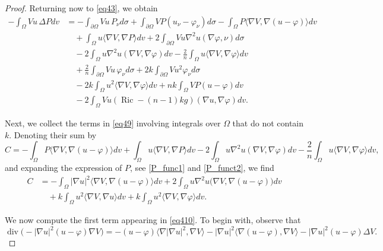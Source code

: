 \documentclass[10pt,a4paper]{amsart}
\begin{document}
\begin{proof}
Returning now to \eqref{eq43}, we obtain
\begin{align}\label{eq49}
-\int_{\Omega}Vu\,\Delta P dv
&=
-\int_{\partial\Omega}Vu\,P_{\nu}d\sigma
+
\int_{\partial\Omega}VP(u_{\nu}-\varphi_{\nu})d\sigma
-
\int_{\Omega}P\langle\nabla V,\nabla(u-\varphi)\rangle dv
\nonumber\\
&\quad
+
\int_{\Omega}u\langle\nabla V,\nabla P\rangle dv
+
2\int_{\partial\Omega}Vu\nabla^{2}u(\nabla\varphi,\nu) d\sigma
\nonumber\\
&\quad
-
2\int_{\Omega}u\nabla^{2}u(\nabla V,\nabla\varphi) dv
-
\frac{2}{n}\int_{\Omega}u\langle\nabla V,\nabla\varphi\rangle dv
\nonumber\\
&\quad
+
\frac{2}{n}\int_{\partial\Omega}Vu\,\varphi_{\nu} d\sigma
+
2k\int_{\partial\Omega}Vu^{2}\varphi_{\nu} d\sigma
\nonumber\\
&\quad
-
2k\int_{\Omega}u^{2}\langle\nabla V,\nabla\varphi\rangle dv
+
nk\int_{\Omega}VP(u-\varphi) dv
\nonumber\\
&\quad
-
2\int_{\Omega}Vu(\operatorname{Ric}-(n-1)kg)(\nabla u,\nabla\varphi) dv.
\end{align}

Next, we collect the terms in \eqref{eq49} involving integrals over \(\Omega\) that do not contain \(k\). Denoting their sum by
\[
C
=
-\int_{\Omega}P\langle\nabla V,\nabla(u-\varphi)\rangle dv
+
\int_{\Omega}u\langle\nabla V,\nabla P\rangle dv
-
2\int_{\Omega}u\nabla^{2}u(\nabla V,\nabla\varphi)dv
-
\frac{2}{n}\int_{\Omega}u\langle\nabla V,\nabla\varphi\rangle dv,
\]
and expanding the expression of \(P\), see \eqref{P_func1} and \eqref{P_funct2}, we find
\begin{align}\label{eq410}
C
&=
-\int_{\Omega}|\nabla u|^{2}
\langle\nabla V,\nabla(u-\varphi)\rangle dv
+
2\int_{\Omega}u\nabla^{2}u\bigl(\nabla V,\nabla(u-\varphi)\bigr) dv
\nonumber\\
&\quad
+
k\int_{\Omega}u^{2}\langle\nabla V,\nabla u\rangle dv
+
k\int_{\Omega}u^{2}\langle\nabla V,\nabla\varphi\rangle dv.
\end{align}

We now compute the first term appearing in \eqref{eq410}. To begin with, observe that
\[
\operatorname{div}\bigl(-|\nabla u|^{2}(u-\varphi)\nabla V\bigr)
=
-(u-\varphi)\langle\nabla |\nabla u|^{2},\nabla V\rangle
-
|\nabla u|^{2}\langle\nabla(u-\varphi),\nabla V\rangle
-
|\nabla u|^{2}(u-\varphi)\Delta V.
\]


\end{proof}
\end{document}
